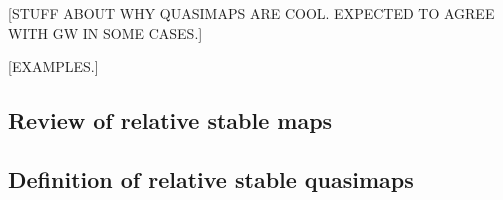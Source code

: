 [STUFF ABOUT WHY QUASIMAPS ARE COOL. EXPECTED TO AGREE WITH GW IN SOME CASES.]

[EXAMPLES.]

\subsection{Review of relative stable maps}

\subsection{Definition of relative stable quasimaps}